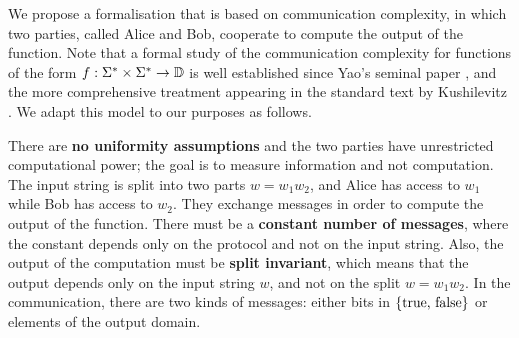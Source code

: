 We propose a formalisation that is based on communication complexity, in which
two parties, called Alice and Bob, cooperate to compute the output of the
function. Note that a formal study of the communication complexity for
functions of the form $f : \Sigma^* \times \Sigma^* \to \mathbb D$ is well
established since Yao's seminal paper \cite{YAO79}, and the more comprehensive
treatment appearing in the standard text by Kushilevitz \cite{KUSH97}.
We adapt
this model to our purposes as follows.

\AP
There are \textbf{no uniformity assumptions} and the two parties
have unrestricted computational power; the goal is to measure information 
and
not computation.  The input string is split into two parts $w = w_1 w_2$, and
Alice has access to $w_1$ while Bob has access to $w_2$. They exchange messages
in order to compute the output of the  function. There must be a
\textbf{constant number of messages}, where the constant  depends only on the
protocol and not on the input string. Also, the  output of the computation must
be \textbf{split invariant}, which means that the output depends only on the
input string $w$, and not on the split $w = w_1 w_2$. In the communication,
there are two kinds of messages:  either bits in $\{\text{true, false}\}$  or
elements of the output domain.
